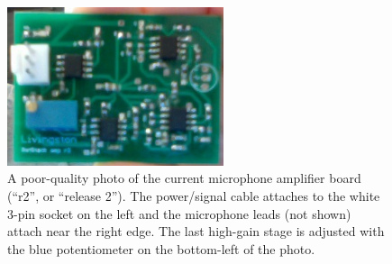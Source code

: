 \documentclass[letterpaper]{article}
\begin{document}
\begin{figure}
\centering
\includegraphics[width=2.5in]{figures/amp_r2_board.png}
\caption[Microphone amplifier board, r2]{A poor-quality photo of the
  current microphone amplifier board (``r2'', or ``release 2''). The
  power/signal cable attaches to the white 3-pin socket on the left
  and the microphone leads (not shown) attach near the right edge. The
  last high-gain stage is adjusted with the blue potentiometer on the
  bottom-left of the photo.}
\label{ampbrd2:fig}
\end{figure}
\end{document}
